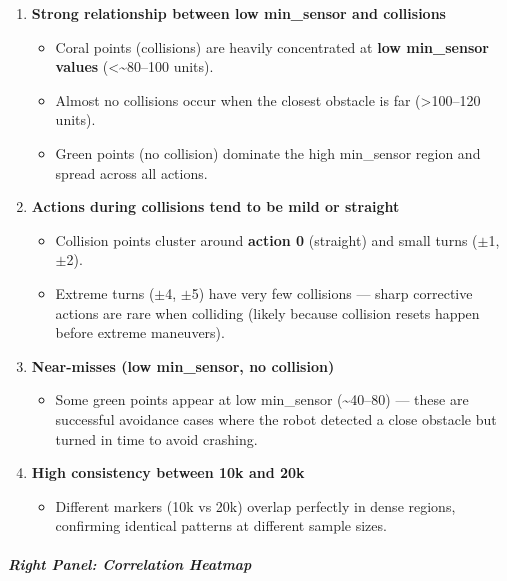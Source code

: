 \begin{enumerate}
\item \textbf{Strong relationship between low min\_sensor and collisions}

\begin{itemize}
\item Coral points (collisions) are heavily concentrated at \textbf{low min\_sensor values} (\textless  {\textasciitilde}80--100 units).
\item Almost no collisions occur when the closest obstacle is far (\textgreater 100--120 units).
\item Green points (no collision) dominate the high min\_sensor region and spread across all actions.
\end{itemize}


\item \textbf{Actions during collisions tend to be mild or straight}

\begin{itemize}
\item Collision points cluster around \textbf{action 0} (straight) and small turns ($\pm$1, $\pm$2).
\item Extreme turns ($\pm$4, $\pm$5) have very few collisions --- sharp corrective actions are rare when colliding (likely because collision resets happen before extreme maneuvers).
\end{itemize}


\item \textbf{Near-misses (low min\_sensor, no collision)}

\begin{itemize}
\item Some green points appear at low min\_sensor ({\textasciitilde}40--80) --- these are successful avoidance cases where the robot detected a close obstacle but turned in time to avoid crashing.
\end{itemize}


\item \textbf{High consistency between 10k and 20k}

\begin{itemize}
\item Different markers (10k vs 20k) overlap perfectly in dense regions, confirming identical patterns at different sample sizes.
\end{itemize}
\end{enumerate}

\subparagraph{Right Panel: Correlation Heatmap}

